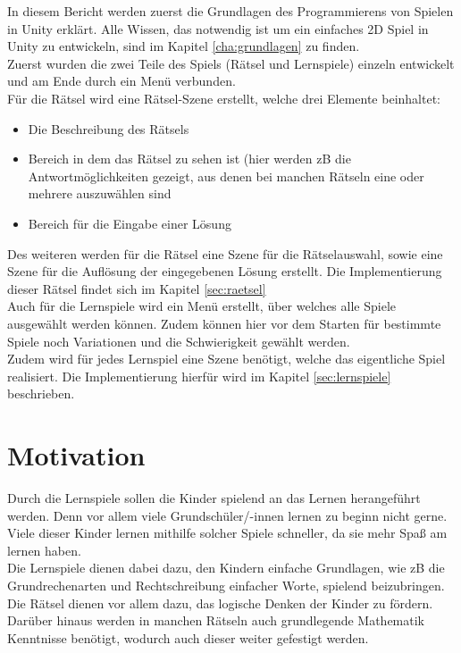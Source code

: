 In diesem Bericht werden zuerst die Grundlagen des Programmierens von Spielen in Unity erklärt. Alle Wissen, das notwendig ist um ein einfaches 2D Spiel in Unity zu entwickeln, sind im Kapitel \ref{cha:grundlagen} zu finden.\\
Zuerst wurden die zwei Teile des Spiels (Rätsel und Lernspiele) einzeln entwickelt und am Ende durch ein Menü verbunden.\\
Für die Rätsel wird eine Rätsel-Szene erstellt, welche drei Elemente beinhaltet:
\begin{itemize}
	\item Die Beschreibung des Rätsels
	\item Bereich in dem das Rätsel zu sehen ist (hier werden zB die Antwortmöglichkeiten gezeigt, aus denen bei manchen Rätseln eine oder mehrere auszuwählen sind %
	\item Bereich für die Eingabe einer Lösung
\end{itemize}
Des weiteren werden für die Rätsel eine Szene für die Rätselauswahl, sowie eine Szene für die Auflösung der eingegebenen Lösung erstellt. Die Implementierung dieser Rätsel findet sich im Kapitel \ref{sec:raetsel}\\

Auch für die Lernspiele wird ein Menü erstellt, über welches alle Spiele ausgewählt werden können. Zudem können hier vor dem Starten für bestimmte Spiele noch Variationen und die Schwierigkeit gewählt werden. \\
Zudem wird für jedes Lernspiel eine Szene benötigt, welche das eigentliche Spiel realisiert. Die Implementierung hierfür wird im Kapitel \ref{sec:lernspiele} beschrieben.\\

\section{Motivation}
\label{sec:motivation}

Durch die Lernspiele sollen die Kinder spielend an das Lernen herangeführt werden. Denn vor allem viele Grundschüler/-innen lernen zu beginn nicht gerne. Viele dieser Kinder lernen mithilfe solcher Spiele schneller, da sie mehr Spaß am lernen haben. \\
Die Lernspiele dienen dabei dazu, den Kindern einfache Grundlagen, wie zB die Grundrechenarten und Rechtschreibung einfacher Worte, spielend beizubringen. Die Rätsel dienen vor allem dazu, das logische Denken der Kinder zu fördern. Darüber hinaus werden in manchen Rätseln auch grundlegende Mathematik Kenntnisse benötigt, wodurch auch dieser weiter gefestigt werden.

